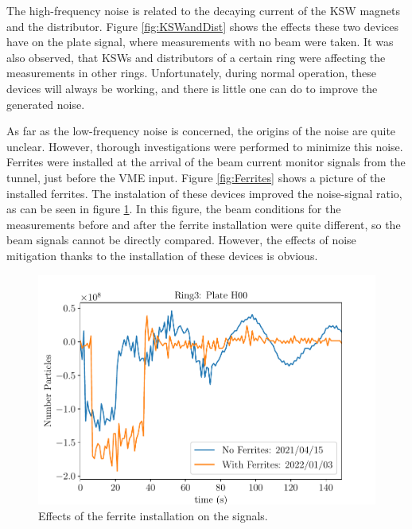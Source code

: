The high-frequency noise is related to the decaying current of the KSW magnets and the distributor. Figure \ref{fig:KSWandDist} shows the effects these two devices have on the plate signal, where measurements with no beam were taken. It was also observed, that KSWs and distributors of a certain ring were affecting the measurements in other rings. Unfortunately, during normal operation, these devices will always be working, and there is little one can do to improve the generated noise. 


As far as the low-frequency noise is concerned, the origins of the noise are quite unclear. However, thorough investigations were performed to minimize this noise. Ferrites \parencite[][]{ref:Ferrites} were installed at the arrival of the \hzhm beam current monitor signals from the tunnel, just before the VME input. Figure \ref{fig:Ferrites} shows a picture of the installed ferrites. The instalation of these devices improved the noise-signal ratio, as can be seen in figure \ref{fig:BefAftFerrites}. In this figure, the beam conditions for the measurements before and after the ferrite installation were quite different, so the beam signals cannot be directly compared. However, the effects of noise mitigation thanks to the installation of these devices is obvious. 

\begin{figure}[h]
    \centering
    \includegraphics[width=0.7\columnwidth]{Figure_FerritesEffect/BfreAfter.pdf}
    \caption{Effects of the ferrite installation on the \hzhm signals. }
    \label{fig:BefAftFerrites}
\end{figure}
